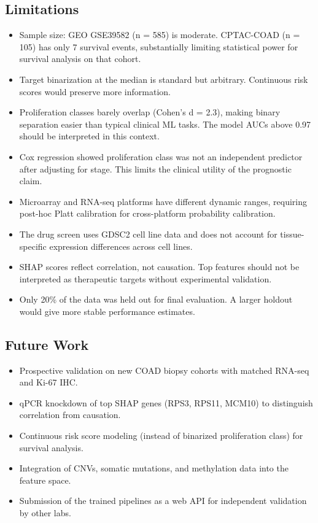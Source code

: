 \documentclass[12pt]{article}
\begin{document}
\subsection{Limitations}

\begin{itemize}
\item Sample size: GEO GSE39582 (n = 585) is moderate. CPTAC-COAD (n = 105) has only 7 survival events, substantially limiting statistical power for survival analysis on that cohort.
\item Target binarization at the median is standard but arbitrary. Continuous risk scores would preserve more information.
\item Proliferation classes barely overlap (Cohen's d = 2.3), making binary separation easier than typical clinical ML tasks. The model AUCs above 0.97 should be interpreted in this context.
\item Cox regression showed proliferation class was not an independent predictor after adjusting for stage. This limits the clinical utility of the prognostic claim.
\item Microarray and RNA-seq platforms have different dynamic ranges, requiring post-hoc Platt calibration for cross-platform probability calibration.
\item The drug screen uses GDSC2 cell line data and does not account for tissue-specific expression differences across cell lines.
\item SHAP scores reflect correlation, not causation. Top features should not be interpreted as therapeutic targets without experimental validation.
\item Only 20\% of the data was held out for final evaluation. A larger holdout would give more stable performance estimates.
\end{itemize}

\subsection{Future Work}

\begin{itemize}
\item Prospective validation on new COAD biopsy cohorts with matched RNA-seq and Ki-67 IHC.
\item qPCR knockdown of top SHAP genes (RPS3, RPS11, MCM10) to distinguish correlation from causation.
\item Continuous risk score modeling (instead of binarized proliferation class) for survival analysis.
\item Integration of CNVs, somatic mutations, and methylation data into the feature space.
\item Submission of the trained pipelines as a web API for independent validation by other labs.
\end{itemize}
\end{document}
